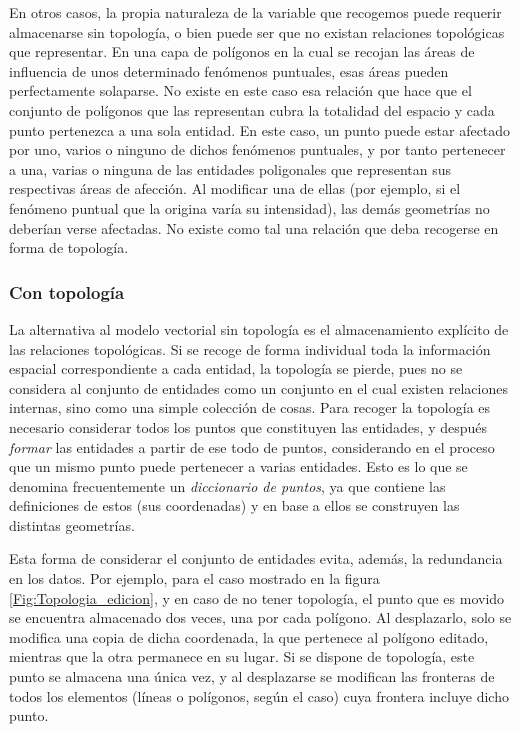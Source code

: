 \begin{multicols}{2}
En otros casos, la propia naturaleza de la variable que recogemos puede requerir almacenarse sin topología, o bien puede ser que no existan relaciones topológicas que representar. En una capa de polígonos en la cual se recojan las áreas de influencia de unos determinado fenómenos puntuales, esas áreas pueden perfectamente solaparse. No existe en este caso esa relación que hace que el conjunto de polígonos que las representan cubra la totalidad del espacio y cada punto pertenezca a una sola entidad. En este caso, un punto puede estar afectado por uno, varios o ninguno de dichos fenómenos puntuales, y por tanto pertenecer a una, varias o ninguna de las entidades poligonales que representan sus respectivas áreas de afección. Al modificar una de ellas (por ejemplo, si el fenómeno puntual que la origina varía su intensidad), las demás geometrías no deberían verse afectadas. No existe como tal una relación que deba recogerse en forma de topología.

\subsubsection{Con topología}

La alternativa al modelo vectorial sin topología es el almacenamiento explícito de las relaciones topológicas. Si se recoge de forma individual toda la información espacial correspondiente a cada entidad, la topología se pierde, pues no se considera al conjunto de entidades como un conjunto en el cual existen relaciones internas, sino como una simple colección de cosas. Para recoger la topología es necesario considerar todos los puntos que constituyen las entidades, y después \emph{formar} las entidades a partir de ese todo de puntos, considerando en el proceso que un mismo punto puede pertenecer a varias entidades. Esto es lo que se denomina frecuentemente un \emph{diccionario de puntos}, ya que contiene las definiciones de estos (sus coordenadas) y en base a ellos se construyen las distintas geometrías. 

Esta forma de considerar el conjunto de entidades evita, además, la redundancia en los datos. Por ejemplo, para el caso mostrado en la figura \ref{Fig:Topologia_edicion}, y en caso de no tener topología, el punto que es movido se encuentra almacenado dos veces, una por cada polígono. Al desplazarlo, solo se modifica una copia de dicha coordenada, la que pertenece al polígono editado, mientras que la otra permanece en su lugar. Si se dispone de topología, este punto se almacena una única vez, y al desplazarse se modifican las fronteras de todos los elementos (líneas o polígonos, según el caso) cuya frontera incluye dicho punto.


\end{multicols}
